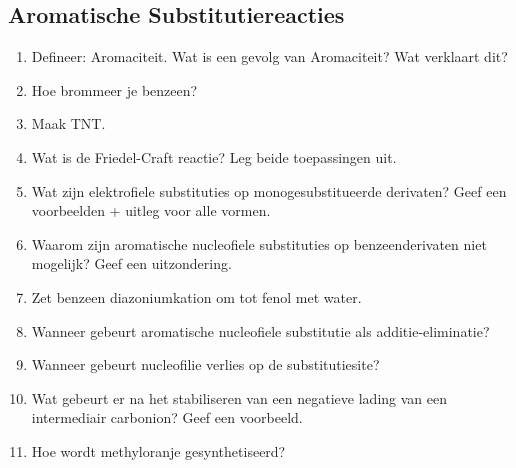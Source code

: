 \documentclass[a4paper,12pt]{article}
\begin{document}
    \subsection*{Aromatische Substitutiereacties}
    \begin{enumerate}
        \item Defineer: Aromaciteit. Wat is een gevolg van Aromaciteit? Wat verklaart dit?
        \item Hoe brommeer je benzeen?
        \item Maak TNT.
        \item Wat is de Friedel-Craft reactie? Leg beide toepassingen uit.
        \item Wat zijn elektrofiele substituties op monogesubstitueerde derivaten? Geef een voorbeelden + uitleg voor alle vormen.
        \item Waarom zijn aromatische nucleofiele substituties op benzeenderivaten niet mogelijk? Geef een uitzondering.
        \item Zet benzeen diazoniumkation om tot fenol met water.
        \item Wanneer gebeurt aromatische nucleofiele substitutie als additie-eliminatie? 
        \item Wanneer gebeurt nucleofilie verlies op de substitutiesite?
        \item Wat gebeurt er na het stabiliseren van een negatieve lading van een intermediair carbonion? Geef een voorbeeld.
        \item Hoe wordt methyloranje gesynthetiseerd?
    \end{enumerate}
\end{document}
